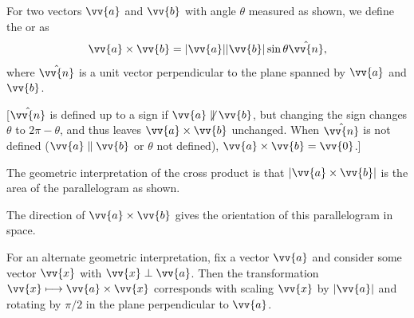   \begin{definition}
For two vectors $\vv{a}$ and $\vv{b}$ with angle  $\theta$ measured as shown, we define the  or  as
$$
\vv{a} \times \vv{b} = | \vv{a}| |\vv{b}| \sin \theta \hat{\vv{n}},
$$
where $\hat{\vv{n}}$ is a unit vector perpendicular to the plane spanned by $\vv{a}$ and $\vv{b}$.

[$\hat{\vv{n}}$ is defined up to a sign if $\vv{a} \not \parallel \vv{b}$, but changing the sign changes $\theta$ to $2\pi - \theta$, and thus leaves $\vv{a} \times \vv{b}$ unchanged. When $\hat{\vv{n}}$ is not defined ($\vv{a} \parallel \vv{b}$ or $\theta$ not defined), $\vv{a} \times \vv{b} = \vv{0}$.] 
  \end{definition}

  The geometric interpretation of the cross product is that $|\vv{a} \times \vv{b}|$ is the area of the parallelogram as shown.

  \begin{center}
  \end{center}

  The direction of $\vv{a} \times \vv{b}$ gives the orientation of this parallelogram in space.   

For an alternate geometric interpretation, fix a vector $\vv{a}$ and consider some vector $\vv{x}$ with $\vv{x} \perp \vv{a}$. Then the transformation $\vv{x} \longmapsto \vv{a} \times \vv{x}$ corresponds with scaling $\vv{x}$ by $|\vv{a}|$ and rotating by $\pi/2$ in the plane perpendicular to $\vv{a}$.

